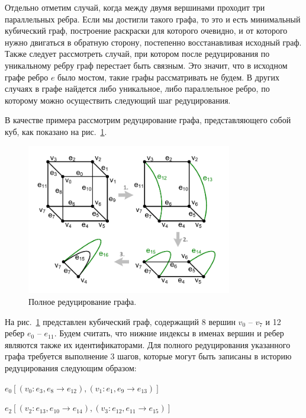 Отдельно отметим случай, когда между двумя вершинами проходит три параллельных ребра.
Если мы достигли такого графа, то это и есть минимальный кубический граф, построение раскраски для которого очевидно, и от которого нужно двигаться в обратную сторону, постепенно восстанавливая исходный граф.
Также следует рассмотреть случай, при котором после редуцирования по уникальному ребру граф перестает быть связным.
Это значит, что в исходном графе ребро $e$ было мостом, такие графы рассматривать не будем.
В других случаях в графе найдется либо уникальное, либо параллельное ребро, по которому можно осуществить следующий шаг редуцирования.

В качестве примера рассмотрим редуцирование графа, представляющего собой куб, как показано на рис.~\ref{fig:text_3_edge_coloring_3}.

\begin{figure}[ht]
\centering
\includegraphics[width=0.8\textwidth]{fig/par_edge_col_3-reduce-0.pdf}
\singlespacing
{}\caption{Полное редуцирование графа.}
\label{fig:text_3_edge_coloring_3}
\end{figure}

На рис.~\ref{fig:text_3_edge_coloring_3} представлен кубический граф, содержащий 8 вершин $v_0$ -- $v_7$ и 12 ребер $e_0$ -- $e_{11}$.
Будем считать, что нижние индексы в именах вершин и ребер являются также их идентификаторами.
Для полного редуцирования указанного графа требуется выполнение 3 шагов, которые могут быть записаны в историю редуцирования следующим образом:

$e_0 [(v_0 : e_3, e_8 \rightarrow e_{12}), (v_1 : e_1, e_9 \rightarrow e_{13})]$

$e_2 [(v_2 : e_{13}, e_{10} \rightarrow e_{14}), (v_3 : e_{12}, e_{11} \rightarrow e_{15})]$

